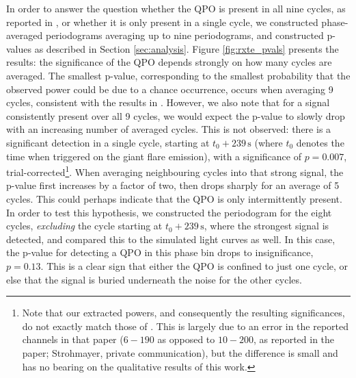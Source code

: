 \documentclass{emulateapj}
\begin{document}
In order to answer the question whether the QPO is present in all nine cycles, as reported in \citet{Strohmayer06}, or whether it is only present in a single cycle, we constructed phase-averaged periodograms averaging up to nine periodograms, and constructed p-values as described in Section \ref{sec:analysis}. Figure \ref{fig:rxte_pvals} presents the results: the significance of the QPO depends strongly on how many cycles are averaged. The smallest p-value, corresponding to the smallest probability that the observed power could be due to a chance occurrence, occurs when averaging 9 cycles, consistent with the results in \citet{Strohmayer06}. However, we also note that for a signal consistently present over all 9 cycles, we would expect the p-value to slowly drop with an increasing number of averaged cycles. This is not observed: there is a significant detection in a single cycle, starting at $t_0 + 239 \,\mathrm{s}$ (where $t_0$ denotes the time when \rxte triggered on the giant flare emission), with a significance of $p = 0.007$, trial-corrected\footnote{Note that our extracted powers, and consequently the resulting significances, do not exactly match those of \citet{Strohmayer06}. This is largely due to an error in the reported channels in that paper ($6-190$ as opposed to $10-200$, as reported in the paper; Strohmayer, private communication), but the difference is small and has no bearing on the qualitative results of this work.}. When averaging neighbouring cycles into that strong signal, the p-value first increases by a factor of two, then drops sharply for an average of 5 cycles. This could perhaps indicate that the QPO is only intermittently present. In order to test this hypothesis, we constructed the periodogram for the eight cycles, {\it excluding} the cycle starting at $t_0 + 239\, \mathrm{s}$, where the strongest signal is detected, and compared this to the simulated light curves as well. In this case, the p-value for detecting a QPO in this phase bin drops to insignificance, $p = 0.13$. This is a clear sign that either the QPO is confined to just one cycle, or else that the signal is buried underneath the noise for the other cycles. 
\end{document}
